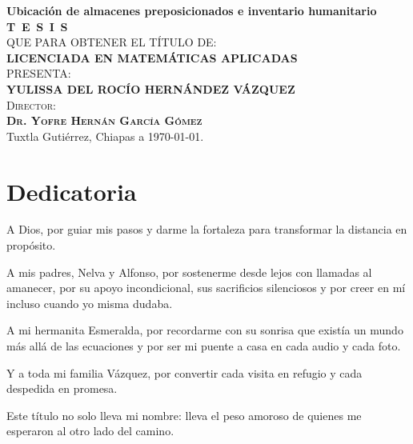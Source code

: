 \documentclass[
  spanish,
  us-letterpaper,
]{scrreprt}
\numberwithin{equation}{section}
\begin{document}
\begin{titlepage}
\begin{minipage}[t][0.95\textheight][c]{0.76\textwidth}
            \begin{center}
                {\Large\bfseries Ubicación de almacenes preposicionados e inventario humanitario}\\[2cm]
                \textsc{\huge \textbf{T\, E\, S\, I\, S}}\\[1.5cm]
                \textsc{\large QUE PARA OBTENER EL TÍTULO DE:}\\[0.3cm]
                \textbf{\textsc{LICENCIADA EN MATEMÁTICAS APLICADAS}}\\[1.5cm]
                \textsc{\large PRESENTA:}\\[0.3cm]
                \textbf{\textsc{\large {YULISSA DEL ROCÍO HERNÁNDEZ VÁZQUEZ}}}\\[2cm]
                {\large\scshape Director:\\[0.3cm]
                {\textbf{\large Dr. Yofre Hernán García Gómez }}}\\[2.0cm]
                \large{Tuxtla Gutiérrez, Chiapas a \today.}

            \end{center}
\end{minipage}
\end{titlepage}

\pagebreak[2]

\chapter*{Dedicatoria}
\begin{center}
\itshape
\setlength{\parindent}{0pt} %
\setlength{\parskip}{1.2\baselineskip} %

A Dios, por guiar mis pasos y darme la fortaleza para transformar la distancia en propósito.

A mis padres, Nelva y Alfonso, por sostenerme desde lejos con llamadas al amanecer, por su apoyo incondicional, sus sacrificios silenciosos y por creer en mí incluso cuando yo misma dudaba.

A mi hermanita Esmeralda, por recordarme con su sonrisa que existía un mundo más allá de las ecuaciones y por ser mi puente a casa en cada audio y cada foto.

Y a toda mi familia Vázquez, por convertir cada visita en refugio y cada despedida en promesa.

Este título no solo lleva mi nombre: lleva el peso amoroso de quienes me esperaron al otro lado del camino.
\end{center}
\end{document}
